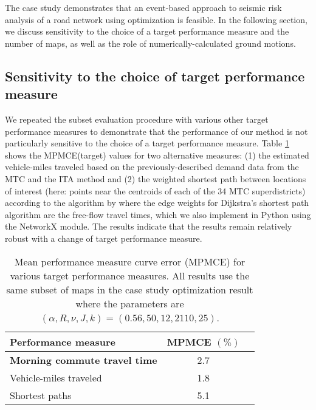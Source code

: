 The case study demonstrates that an event-based approach to seismic risk analysis of a road network using optimization is feasible. In the following section, we discuss sensitivity to the choice of a target performance measure and the number of maps, as well as the role of numerically-calculated ground motions.

\subsection{Sensitivity to the choice of target performance measure}
We repeated the subset evaluation procedure with various other target performance measures to demonstrate that the performance of our method is not particularly sensitive to the choice of a target performance measure. Table \ref{table:others} shows the MPMCE(target) values for two alternative measures: (1) the estimated vehicle-miles traveled based on the previously-described demand data from the MTC and the ITA method and (2)  the weighted shortest path between locations of interest (here: points near the centroids of each of the 34 MTC superdistricts) according to the algorithm by \cite{chang_measuring_2001} where the edge weights for Dijkstra's shortest path algorithm are the free-flow travel times, which we also implement in Python using the NetworkX module. The results indicate that the results remain relatively robust with a change of target performance measure. 

\begin{table}
\centering
\begin{tabular}{l*{1}{c}r}
\hline
\hline
Performance measure             & MPMCE $(\%)$ \\
\hline
\textbf{Morning commute travel time}           & 2.7  \\
Vehicle-miles traveled     & 1.8  \\
Shortest paths     & 5.1  \\
\hline
\hline
\end{tabular}
\caption{Mean performance measure curve error (MPMCE) for various target performance measures. All results use the same subset of maps in the case study optimization result where the parameters are $(\alpha, R, \nu, J, k) = (0.56, 50, 12, 2110, 25)$.}
\label{table:others}
\end{table}


